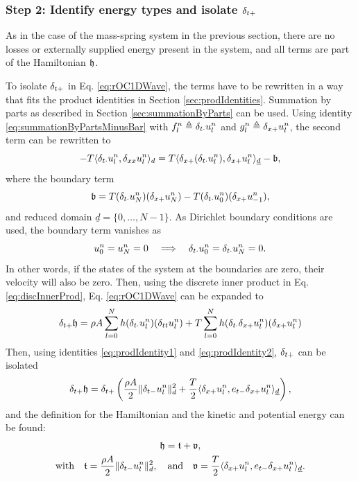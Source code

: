 {{\subsubsection{Step 2: Identify energy types and isolate $\delta_{t+}$}
As in the case of the mass-spring system in the previous section, there are no losses or externally supplied energy present in the system, and all terms are part of the Hamiltonian $\mathfrak{h}$.

To isolate $\delta_{t+}$ in Eq. \eqref{eq:rOC1DWave}, the terms have to be rewritten in a way that fits the product identities in Section \ref{sec:prodIdentities}.
Summation by parts as described in Section \ref{sec:summationByParts}  can be used. Using identity \eqref{eq:summationByPartsMinusBar}  with $f_l^n \triangleq \delta_{t\cdot} u_l^n$ and $g_l^n \triangleq \delta_{x+} u_l^n$, the second term can be rewritten to 
%
\begin{equation*}
    - T \langle \delta_{t\cdot}u_l^n, \delta_{xx} u_l^n\rangle_d  = T\langle \delta_{x+}(\delta_{t\cdot}u_l^n), \delta_{x+}u_l^n\rangle_{\underline{d}} - \mathfrak{b},
\end{equation*}
where the boundary term
\begin{equation*}
    \mathfrak{b} = T(\delta_{t\cdot} u_N^n)(\delta_{x+} u_N^n) - T(\delta_{t\cdot} u_0^n) (\delta_{x+} u_{-1}^n),
\end{equation*}
and reduced domain $\underline{d} = \{0, \hdots, N-1\}$. As Dirichlet boundary conditions are used, the boundary term vanishes as 
\begin{equation*}
    u_0^n = u_N^n = 0 \quad \Longrightarrow \quad \delta_{t\cdot} u_0^n = \delta_{t\cdot} u_N^n = 0.
\end{equation*}
In other words, if the states of the system at the boundaries are zero, their velocity will also be zero. 
Then, using the discrete inner product in Eq. \eqref{eq:discInnerProd}, Eq. \eqref{eq:rOC1DWave} can be expanded to
\begin{equation}
    \delta_{t+} \mathfrak{h} = \rho A \sum_{l = 0}^N h(\delta_{t\cdot} u_l^n)(\delta_{tt} u_l^n) + T \sum_{l = 0}^N h(\delta_{t\cdot} \delta_{x+} u_l^n)(\delta_{x+} u_l^n)
\end{equation}
Then, using identities \eqref{eq:prodIdentity1} and \eqref{eq:prodIdentity2}, $\delta_{t+}$ can be isolated 
\begin{equation}
    \delta_{t+} \mathfrak{h} = \delta_{t+} \left(\frac{\rho A}{2}\lVert\delta_{t-} u_l^n\rVert^2_d + \frac{T}{2}\langle\delta_{x+}u_l^n, e_{t-}\delta_{x+}u_l^n\rangle_{\underline{d}}\right),
\end{equation}
and the definition for the Hamiltonian and the kinetic and potential energy can be found:
\begin{equation}\label{eq:energyBalance1DWave}
    \begin{gathered}
        \mathfrak{h} = \mathfrak{t} + \mathfrak{v},\\
        \text{with}\quad \mathfrak{t} = \frac{\rho A}{2}\lVert\delta_{t-} u_l^n\rVert^2_d, \quad \text{and} \quad \mathfrak{v} = \frac{T}{2}\langle\delta_{x+}u_l^n, e_{t-}\delta_{x+}u_l^n\rangle_{\underline{d}}.
    \end{gathered}
\end{equation}

}}

